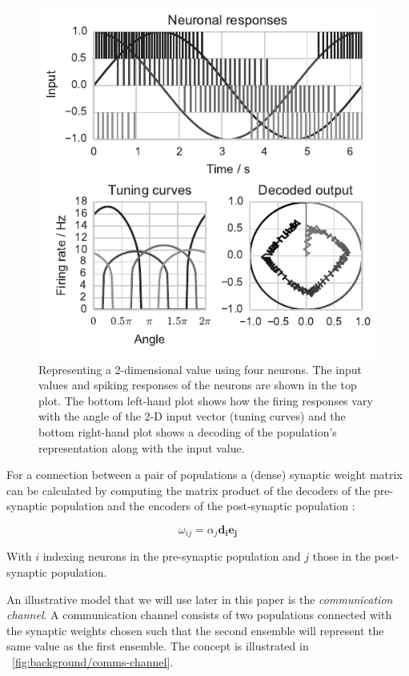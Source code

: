 \documentclass[conference]{IEEEtran}
\renewcommand{\vec}{\mathbf}  %
\begin{document}
  \begin{figure}[!t]
    \includegraphics{figures/nef-1}
    \caption{%
      Representing a 2-dimensional value using four neurons. The input values and spiking responses of the neurons are shown in the top plot.
      The bottom left-hand plot shows how the firing responses vary with the angle of the 2-D input vector (tuning curves) and the bottom right-hand plot shows a decoding of the population's representation along with the input value.}
    \label{fig:background/nef-1}
  \end{figure}

For a connection between a pair of populations a (dense) synaptic weight matrix can be calculated by computing the matrix product of the decoders of the pre-synaptic population and the encoders of the post-synaptic population \parencite{Stewart2014}:

\begin{equation}
  \omega_{ij} = \alpha_j \vec{d_i}\vec{e_j}  \label{eq:weights}
\end{equation}

With $i$ indexing neurons in the pre-synaptic population and $j$ those in the post-synaptic population.

An illustrative model that we will use later in this paper is the \textit{communication channel}.
  A communication channel consists of two populations connected with the synaptic weights chosen such that the second ensemble will represent the same value as the first ensemble.
  The concept is illustrated in \figurename~\ref{fig:background/comms-channel}.
\end{document}
